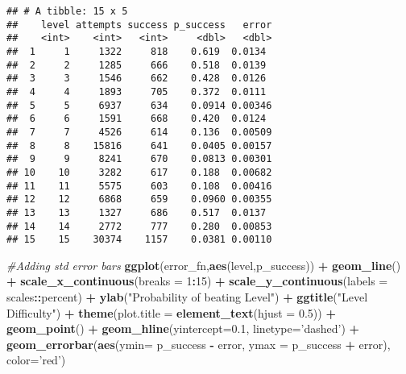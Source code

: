 \documentclass[
]{article}
\newenvironment{Shaded}{\begin{snugshade}}{\end{snugshade}}
\newcommand{\CommentTok}[1]{\textcolor[rgb]{0.56,0.35,0.01}{\textit{#1}}}
\newcommand{\DataTypeTok}[1]{\textcolor[rgb]{0.13,0.29,0.53}{#1}}
\newcommand{\DecValTok}[1]{\textcolor[rgb]{0.00,0.00,0.81}{#1}}
\newcommand{\FloatTok}[1]{\textcolor[rgb]{0.00,0.00,0.81}{#1}}
\newcommand{\KeywordTok}[1]{\textcolor[rgb]{0.13,0.29,0.53}{\textbf{#1}}}
\newcommand{\NormalTok}[1]{#1}
\newcommand{\OperatorTok}[1]{\textcolor[rgb]{0.81,0.36,0.00}{\textbf{#1}}}
\newcommand{\StringTok}[1]{\textcolor[rgb]{0.31,0.60,0.02}{#1}}
\begin{document}
\begin{verbatim}
## # A tibble: 15 x 5
##    level attempts success p_success   error
##    <int>    <int>   <int>     <dbl>   <dbl>
##  1     1     1322     818    0.619  0.0134 
##  2     2     1285     666    0.518  0.0139 
##  3     3     1546     662    0.428  0.0126 
##  4     4     1893     705    0.372  0.0111 
##  5     5     6937     634    0.0914 0.00346
##  6     6     1591     668    0.420  0.0124 
##  7     7     4526     614    0.136  0.00509
##  8     8    15816     641    0.0405 0.00157
##  9     9     8241     670    0.0813 0.00301
## 10    10     3282     617    0.188  0.00682
## 11    11     5575     603    0.108  0.00416
## 12    12     6868     659    0.0960 0.00355
## 13    13     1327     686    0.517  0.0137 
## 14    14     2772     777    0.280  0.00853
## 15    15    30374    1157    0.0381 0.00110
\end{verbatim}

\begin{Shaded}
\begin{Highlighting}[]
\CommentTok{#Adding std error bars}
\KeywordTok{ggplot}\NormalTok{(error_fn,}\KeywordTok{aes}\NormalTok{(level,p_success)) }\OperatorTok{+}
\StringTok{  }\KeywordTok{geom_line}\NormalTok{() }\OperatorTok{+}\StringTok{ }\KeywordTok{scale_x_continuous}\NormalTok{(}\DataTypeTok{breaks =} \DecValTok{1}\OperatorTok{:}\DecValTok{15}\NormalTok{) }\OperatorTok{+}
\StringTok{  }\KeywordTok{scale_y_continuous}\NormalTok{(}\DataTypeTok{labels =}\NormalTok{ scales}\OperatorTok{::}\NormalTok{percent) }\OperatorTok{+}
\StringTok{  }\KeywordTok{ylab}\NormalTok{(}\StringTok{"Probability of beating Level"}\NormalTok{) }\OperatorTok{+}
\StringTok{  }\KeywordTok{ggtitle}\NormalTok{(}\StringTok{"Level Difficulty"}\NormalTok{) }\OperatorTok{+}
\StringTok{  }\KeywordTok{theme}\NormalTok{(}\DataTypeTok{plot.title =} \KeywordTok{element_text}\NormalTok{(}\DataTypeTok{hjust =} \FloatTok{0.5}\NormalTok{)) }\OperatorTok{+}
\StringTok{  }\KeywordTok{geom_point}\NormalTok{() }\OperatorTok{+}
\StringTok{  }\KeywordTok{geom_hline}\NormalTok{(}\DataTypeTok{yintercept=}\FloatTok{0.1}\NormalTok{, }\DataTypeTok{linetype=}\StringTok{'dashed'}\NormalTok{) }\OperatorTok{+}
\StringTok{  }\KeywordTok{geom_errorbar}\NormalTok{(}\KeywordTok{aes}\NormalTok{(}\DataTypeTok{ymin=}\NormalTok{ p_success }\OperatorTok{-}\StringTok{ }\NormalTok{error, }\DataTypeTok{ymax =}\NormalTok{ p_success }\OperatorTok{+}\StringTok{ }\NormalTok{error), }
                \DataTypeTok{color=}\StringTok{'red'}\NormalTok{)}
\end{Highlighting}
\end{Shaded}
\end{document}

